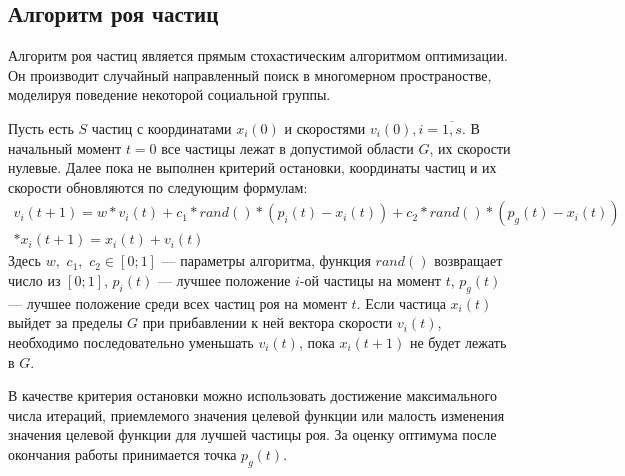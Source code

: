 \subsection{Алгоритм роя частиц}
\label{subse:pso}
Алгоритм роя частиц является прямым стохастическим алгоритмом оптимизации. Он производит
случайный направленный поиск в многомерном пространостве, моделируя поведение некоторой
социальной группы.
\par
Пусть есть \(S\) частиц с координатами \(x_i(0)\) и скоростями \(v_i(0),i=\overline{1,s}\).
В начальный момент \(t=0\) все частицы лежат в допустимой области \(G\), их скорости нулевые.
Далее пока не выполнен критерий остановки, координаты частиц и их скорости обновляются по следующим формулам:
\begin{displaymath}
  \begin{array}{l}
v_i(t+1)=w*v_i(t) + c_1*rand()*(p_i(t)-x_i(t)) + c_2*rand()*(p_g(t)-x_i(t)) \\*
x_i(t+1)= x_i(t) + v_i(t)
\end{array}
\end{displaymath}
Здесь \(w,\) \(c_1,\) \(c_2 \in [0;1]\) --- параметры алгоритма, функция \(rand()\) возвращает число из
\([0;1]\), \(p_i(t)\) --- лучшее положение \(i\)-ой частицы на момент \(t\),  \(p_g(t)\) ---
лучшее положение среди всех частиц роя на момент \(t\).
Если частица \(x_i(t)\) выйдет за пределы \(G\) при прибавлении к ней вектора скорости \(v_i(t)\),
необходимо последовательно уменьшать \(v_i(t)\), пока \(x_i(t+1)\) не будет лежать в \(G\).
\par
В качестве критерия остановки можно использовать достижение максимального числа итераций,
приемлемого значения целевой функции или малость изменения значения целевой функции для лучшей
частицы роя.
За оценку оптимума после окончания работы принимается точка \(p_g(t)\).
